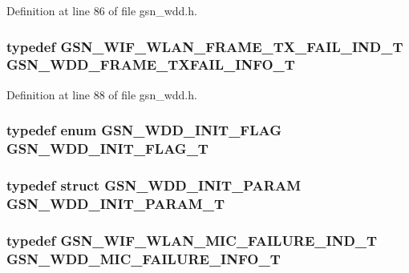 Definition at line 86 of file gsn\_\-wdd.h.

\hypertarget{a00603_abf86a06ce9b3aa862dc938b896b11ca6}{
\subsubsection[{GSN\_\-WDD\_\-FRAME\_\-TXFAIL\_\-INFO\_\-T}]{\setlength{\rightskip}{0pt plus 5cm}typedef {\bf GSN\_\-WIF\_\-WLAN\_\-FRAME\_\-TX\_\-FAIL\_\-IND\_\-T} {\bf GSN\_\-WDD\_\-FRAME\_\-TXFAIL\_\-INFO\_\-T}}}
\label{a00603_abf86a06ce9b3aa862dc938b896b11ca6}


Definition at line 88 of file gsn\_\-wdd.h.

\hypertarget{a00603_ae0e55b26e7cfed5cc849b360e24289e3}{
\subsubsection[{GSN\_\-WDD\_\-INIT\_\-FLAG\_\-T}]{\setlength{\rightskip}{0pt plus 5cm}typedef enum {\bf GSN\_\-WDD\_\-INIT\_\-FLAG} {\bf GSN\_\-WDD\_\-INIT\_\-FLAG\_\-T}}}
\label{a00603_ae0e55b26e7cfed5cc849b360e24289e3}
\hypertarget{a00603_a3906d6f291df3ccb5d770f1fe7eec5e4}{
\subsubsection[{GSN\_\-WDD\_\-INIT\_\-PARAM\_\-T}]{\setlength{\rightskip}{0pt plus 5cm}typedef struct {\bf GSN\_\-WDD\_\-INIT\_\-PARAM} {\bf GSN\_\-WDD\_\-INIT\_\-PARAM\_\-T}}}
\label{a00603_a3906d6f291df3ccb5d770f1fe7eec5e4}
\hypertarget{a00603_a807e44a4a859b36de8babbf87eef011b}{
\subsubsection[{GSN\_\-WDD\_\-MIC\_\-FAILURE\_\-INFO\_\-T}]{\setlength{\rightskip}{0pt plus 5cm}typedef {\bf GSN\_\-WIF\_\-WLAN\_\-MIC\_\-FAILURE\_\-IND\_\-T} {\bf GSN\_\-WDD\_\-MIC\_\-FAILURE\_\-INFO\_\-T}}}
\label{a00603_a807e44a4a859b36de8babbf87eef011b}


